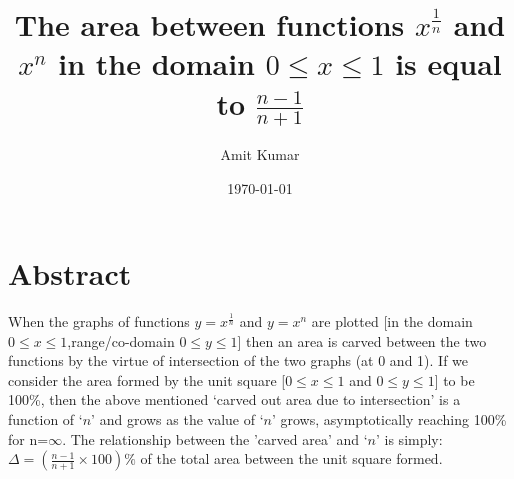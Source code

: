 \documentclass[10pt, twoside]{article}
\title{The area between functions $x^{\frac{1}{n}}$ and $x^n$ in the domain $0 \le x \le 1$ is equal to $\frac{n-1}{n+1}$}
\author{Amit Kumar}
\date{\today}
\begin{document}
\maketitle
\section{Abstract}
When the graphs of functions $y=x^{\frac{1}{n}}$ and $y=x^n$ are plotted [in the domain $0 \le x \le 1$,range/co-domain $0 \le y \le 1$] then an area is carved between the two functions by the virtue of intersection of the two graphs (at 0 and 1). If we consider the area formed by the unit square [$0 \le x \le 1$ and $0 \le y \le 1$] to be 100\%, then the above mentioned `carved out area due to intersection' is a function of `$n$' and grows as the value of `$n$' grows, asymptotically reaching 100\% for n=$\infty$. The relationship between the 'carved area' and `$n$' is simply: $\Delta = (\frac{n-1}{n+1}\times{100})\%$ of the total area between the unit square formed.
\end{document}
